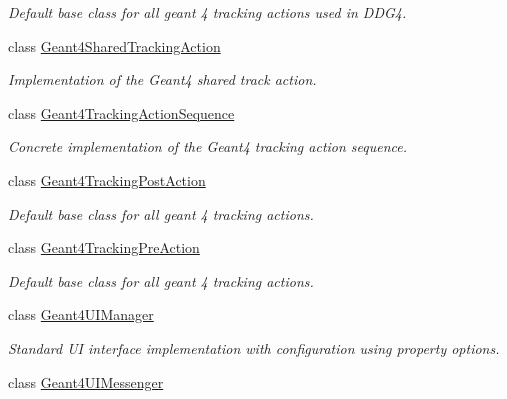 \begin{DoxyCompactItemize}
\begin{DoxyCompactList}\small\item\em Default base class for all geant 4 tracking actions used in DDG4. \item\end{DoxyCompactList}\item 
class \hyperlink{class_d_d4hep_1_1_simulation_1_1_geant4_shared_tracking_action}{Geant4SharedTrackingAction}
\begin{DoxyCompactList}\small\item\em Implementation of the Geant4 shared track action. \item\end{DoxyCompactList}\item 
class \hyperlink{class_d_d4hep_1_1_simulation_1_1_geant4_tracking_action_sequence}{Geant4TrackingActionSequence}
\begin{DoxyCompactList}\small\item\em Concrete implementation of the Geant4 tracking action sequence. \item\end{DoxyCompactList}\item 
class \hyperlink{class_d_d4hep_1_1_simulation_1_1_geant4_tracking_post_action}{Geant4TrackingPostAction}
\begin{DoxyCompactList}\small\item\em Default base class for all geant 4 tracking actions. \item\end{DoxyCompactList}\item 
class \hyperlink{class_d_d4hep_1_1_simulation_1_1_geant4_tracking_pre_action}{Geant4TrackingPreAction}
\begin{DoxyCompactList}\small\item\em Default base class for all geant 4 tracking actions. \item\end{DoxyCompactList}\item 
class \hyperlink{class_d_d4hep_1_1_simulation_1_1_geant4_u_i_manager}{Geant4UIManager}
\begin{DoxyCompactList}\small\item\em Standard UI interface implementation with configuration using property options. \item\end{DoxyCompactList}\item 
class \hyperlink{class_d_d4hep_1_1_simulation_1_1_geant4_u_i_messenger}{Geant4UIMessenger}

\end{DoxyCompactItemize}
